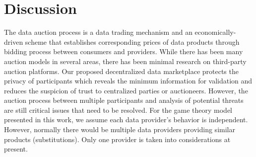 \documentclass[journal,article,applsci,submit,moreauthors,pdftex]{Definitions/mdpi}
\begin{document}


\section{Discussion}

The data auction process is a data trading mechanism and an economically-driven scheme that establishes corresponding prices of data products through bidding process between consumers and providers. While there has been many auction models\cite{BigPicDataMarket} in several areas, there has been minimal research on third-party auction platforms. Our proposed decentralized data marketplace protects the privacy of participants which reveals the minimum information for validation and reduces the suspicion of trust to centralized parties or auctioneers. However, the auction process between multiple participants and analysis of potential threats are still critical issues that need to be resolved. For the game theory model presented in this work, we assume each data provider's behavior is independent. However, normally there would be multiple data providers providing similar products (substitutions). Only one provider is taken into considerations at present.






%
\end{document}
